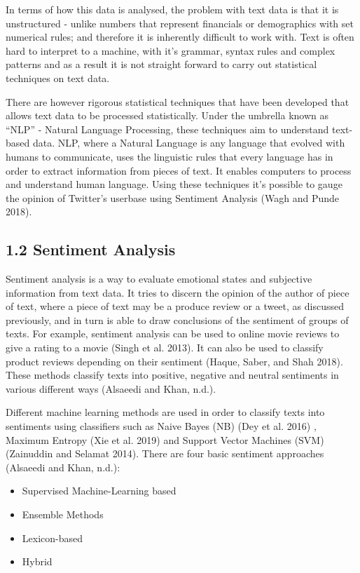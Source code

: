 \documentclass[
]{article}
\providecommand{\tightlist}{%
  \setlength{\itemsep}{0pt}\setlength{\parskip}{0pt}}
\begin{document}
In terms of how this data is analysed, the problem with text data is
that it is unstructured - unlike numbers that represent financials or
demographics with set numerical rules; and therefore it is inherently
difficult to work with. Text is often hard to interpret to a machine,
with it's grammar, syntax rules and complex patterns and as a result it
is not straight forward to carry out statistical techniques on text
data.

There are however rigorous statistical techniques that have been
developed that allows text data to be processed statistically. Under the
umbrella known as ``NLP'' - Natural Language Processing, these
techniques aim to understand text-based data. NLP, where a Natural
Language is any language that evolved with humans to communicate, uses
the linguistic rules that every language has in order to extract
information from pieces of text. It enables computers to process and
understand human language. Using these techniques it's possible to gauge
the opinion of Twitter's userbase using Sentiment Analysis (Wagh and
Punde 2018).

\hypertarget{sentiment-analysis}{%
\subsection{1.2 Sentiment Analysis}\label{sentiment-analysis}}

Sentiment analysis is a way to evaluate emotional states and subjective
information from text data. It tries to discern the opinion of the
author of piece of text, where a piece of text may be a produce review
or a tweet, as discussed previously, and in turn is able to draw
conclusions of the sentiment of groups of texts. For example, sentiment
analysis can be used to online movie reviews to give a rating to a movie
(Singh et al. 2013). It can also be used to classify product reviews
depending on their sentiment (Haque, Saber, and Shah 2018). These
methods classify texts into positive, negative and neutral sentiments in
various different ways (Alsaeedi and Khan, n.d.).

Different machine learning methods are used in order to classify texts
into sentiments using classifiers such as Naive Bayes (NB) (Dey et al.
2016) , Maximum Entropy (Xie et al. 2019) and Support Vector Machines
(SVM) (Zainuddin and Selamat 2014). There are four basic sentiment
approaches (Alsaeedi and Khan, n.d.):

\begin{itemize}
\tightlist
\item
  Supervised Machine-Learning based
\item
  Ensemble Methods
\item
  Lexicon-based
\item
  Hybrid
\end{itemize}
\end{document}
